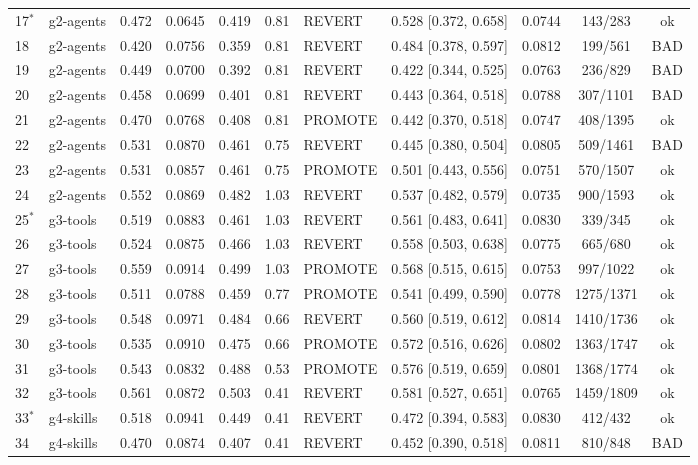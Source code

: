\begin{tabular}{llcccclccc c}
17$^*$ & g2-agents & 0.472 & 0.0645 & 0.419 & 0.81 & REVERT & 0.528 [0.372, 0.658] & 0.0744 & 143/283 & ok \\
18 & g2-agents & 0.420 & 0.0756 & 0.359 & 0.81 & REVERT & 0.484 [0.378, 0.597] & 0.0812 & 199/561 & BAD \\
19 & g2-agents & 0.449 & 0.0700 & 0.392 & 0.81 & REVERT & 0.422 [0.344, 0.525] & 0.0763 & 236/829 & BAD \\
20 & g2-agents & 0.458 & 0.0699 & 0.401 & 0.81 & REVERT & 0.443 [0.364, 0.518] & 0.0788 & 307/1101 & BAD \\
21 & g2-agents & 0.470 & 0.0768 & 0.408 & 0.81 & PROMOTE & 0.442 [0.370, 0.518] & 0.0747 & 408/1395 & ok \\
22 & g2-agents & 0.531 & 0.0870 & 0.461 & 0.75 & REVERT & 0.445 [0.380, 0.504] & 0.0805 & 509/1461 & BAD \\
23 & g2-agents & 0.531 & 0.0857 & 0.461 & 0.75 & PROMOTE & 0.501 [0.443, 0.556] & 0.0751 & 570/1507 & ok \\
24 & g2-agents & 0.552 & 0.0869 & 0.482 & 1.03 & REVERT & 0.537 [0.482, 0.579] & 0.0735 & 900/1593 & ok \\
25$^*$ & g3-tools & 0.519 & 0.0883 & 0.461 & 1.03 & REVERT & 0.561 [0.483, 0.641] & 0.0830 & 339/345 & ok \\
26 & g3-tools & 0.524 & 0.0875 & 0.466 & 1.03 & REVERT & 0.558 [0.503, 0.638] & 0.0775 & 665/680 & ok \\
27 & g3-tools & 0.559 & 0.0914 & 0.499 & 1.03 & PROMOTE & 0.568 [0.515, 0.615] & 0.0753 & 997/1022 & ok \\
28 & g3-tools & 0.511 & 0.0788 & 0.459 & 0.77 & PROMOTE & 0.541 [0.499, 0.590] & 0.0778 & 1275/1371 & ok \\
29 & g3-tools & 0.548 & 0.0971 & 0.484 & 0.66 & REVERT & 0.560 [0.519, 0.612] & 0.0814 & 1410/1736 & ok \\
30 & g3-tools & 0.535 & 0.0910 & 0.475 & 0.66 & PROMOTE & 0.572 [0.516, 0.626] & 0.0802 & 1363/1747 & ok \\
31 & g3-tools & 0.543 & 0.0832 & 0.488 & 0.53 & PROMOTE & 0.576 [0.519, 0.659] & 0.0801 & 1368/1774 & ok \\
32 & g3-tools & 0.561 & 0.0872 & 0.503 & 0.41 & REVERT & 0.581 [0.527, 0.651] & 0.0765 & 1459/1809 & ok \\
33$^*$ & g4-skills & 0.518 & 0.0941 & 0.449 & 0.41 & REVERT & 0.472 [0.394, 0.583] & 0.0830 & 412/432 & ok \\
34 & g4-skills & 0.470 & 0.0874 & 0.407 & 0.41 & REVERT & 0.452 [0.390, 0.518] & 0.0811 & 810/848 & BAD \\

\end{tabular}
